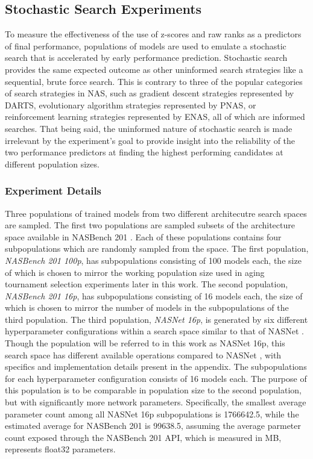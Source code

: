 \documentclass[twocolumn]{article}
\begin{document}
\subsection{Stochastic Search Experiments}
To measure the effectiveness of the use of z-scores and raw ranks as a predictors of final performance, populations of models are used to
emulate a stochastic search that is accelerated by early performance prediction. 
Stochastic search provides the same expected outcome as other uninformed search strategies like a sequential, brute force search.
This is contrary to three of the popular categories of search strategies in NAS, such as gradient descent strategies represented by DARTS\cite{darts}, 
evolutionary algorithm strategies represented by PNAS\cite{pnas}, or reinforcement learning strategies represented by ENAS\cite{enas}, all of which are informed searches.
That being said, the uninformed nature of stochastic search is made irrelevant by the experiment's goal to provide insight into the reliability 
of the two performance predictors at finding the highest performing candidates at different population sizes. 

\subsubsection{Experiment Details}
Three populations of trained models from two different architecutre search spaces are sampled.
The first two populations are sampled subsets of the architecture space available in NASBench 201 \cite{nasbench201}.
Each of these populations contains four subpopulations which are randomly sampled from the space.
The first population, \emph{NASBench 201 100p}, has subpopulations consisting of 100 models each, the size of which is chosen to mirror the working population size 
used in aging tournament selection experiments later in this work.
The second population, \emph{NASBench 201 16p}, has subpopulations consisting of 16 models each, the size of which is chosen to mirror the number of models in the 
subpopulations of the third population.
The third population, \emph{NASNet 16p}, is generated by six different hyperparameter configurations within a search space similar to that of NASNet \cite{nasnet}.
Though the population will be referred to in this work as NASNet 16p, this search space has different available operations compared to NASNet \cite{nasnet}, 
with specifics and implementation details present in the appendix.
The subpopulations for each hyperparameter configuration consists of 16 models each.
The purpose of this population is to be comparable in population size to the second population, but with significantly more network parameters.
Specifically, the smallest average parameter count among all NASNet 16p subpopulations is 1766642.5, while the estimated average for NASBench 201 is 99638.5, assuming
the average parmeter count exposed through the NASBench 201 API, which is measured in MB, represents float32 parameters.
\end{document}
